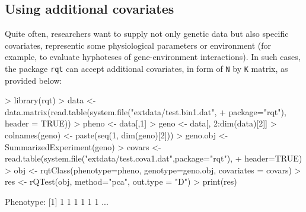 \documentclass{article}
\begin{document}
\subsection{Using additional covariates}

Quite often, researchers want to supply not only genetic 
data but also specific covariates, 
representic some physiological parameters or environment 
(for example, to evaluate 
hyphoteses of gene-environment interactions). 
In such cases, the package \texttt{rqt} 
can accept additional covariates, in form of 
\texttt{N} by \texttt{K} matrix, as provided below:

\begin{Schunk}
\begin{Sinput}
> library(rqt)
> data <- data.matrix(read.table(system.file("extdata/test.bin1.dat",
+                                            package="rqt"), header = TRUE))
> pheno <- data[,1]
> geno <- data[, 2:dim(data)[2]]
> colnames(geno) <- paste(seq(1, dim(geno)[2]))
> geno.obj <- SummarizedExperiment(geno)
> covars <- read.table(system.file("extdata/test.cova1.dat",package="rqt"), 
+     header=TRUE)
> obj <- rqtClass(phenotype=pheno, genotype=geno.obj, covariates = covars)
> res <- rQTest(obj, method="pca", out.type = "D")
> print(res)
\end{Sinput}
\begin{Soutput}
Phenotype:
[1] 1 1 1 1 1 1
...


\end{Soutput}
\end{Schunk}
\end{document}
